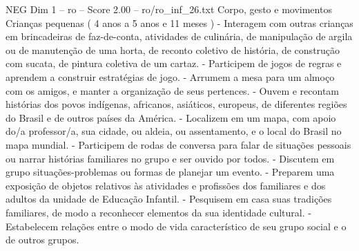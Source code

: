 \begin{textsample}{NEG Dim 1 – ro – Score 2.00 – ro/ro\_inf\_26.txt}  \label{ex:f1_neg_159}
Corpo, gesto e movimentos Crianças pequenas ( 4 anos a 5 anos e 11 meses ) - Interagem com outras crianças em brincadeiras de faz-de-conta, atividades de culinária, de manipulação de argila ou de manutenção de uma horta, de reconto coletivo de história, de construção com sucata, de pintura coletiva de um cartaz. - Participem de jogos de regras e aprendem a construir estratégias de jogo. - Arrumem a mesa para um almoço com os amigos, e manter a organização de seus pertences. - Ouvem e recontam histórias dos povos indígenas, africanos, asiáticos, europeus, de diferentes regiões do Brasil e de outros países da América. - Localizem em um mapa, com apoio do/a professor/a, sua cidade, ou aldeia, ou assentamento, e o local do Brasil no mapa mundial. - Participem de rodas de conversa para falar de situações pessoais ou narrar histórias familiares no grupo e ser ouvido por todos. - Discutem em grupo situações-problemas ou formas de planejar um evento. - Preparem uma exposição de objetos relativos às atividades e profissões dos familiares e dos adultos da unidade de Educação Infantil. - Pesquisem em casa suas tradições familiares, de modo a reconhecer elementos da sua identidade cultural. - Estabelecem relações entre o modo de vida característico de seu grupo social e o de outros grupos.

\end{textsample}

